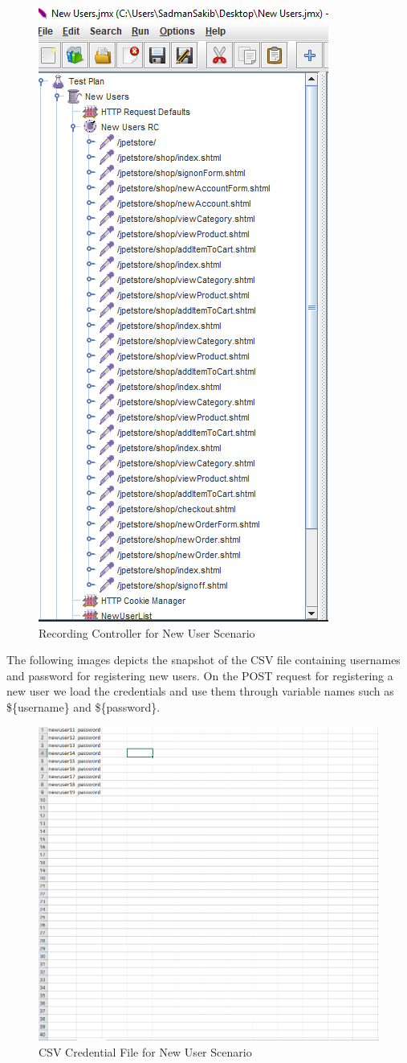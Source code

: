 \documentclass[fontsize=12pt,paper=letter,twoside]{scrartcl}
\begin{document}
\begin{figure}[!htb]
\begin{center}
\includegraphics[width=.5\textwidth]{../../load-test/test-plans/new-user/rc.png}
\end{center}
\caption{Recording Controller for New User Scenario}
\label{fig:ruser:rc}
\end{figure}

\bigskip
\noindent The following images depicts the snapshot of the CSV file containing usernames and password for registering new users. On the POST request for registering a new user we load the credentials and use them through variable names such as \$\{username\} and \$\{password\}.

\begin{figure}[!htb]
\begin{center}
\includegraphics[width=.6\textwidth]{../../load-test/test-plans/new-user/csv.png}
\end{center}
\caption{CSV Credential File for New User Scenario}
\label{fig:ruser:csv}
\end{figure}
\end{document}
